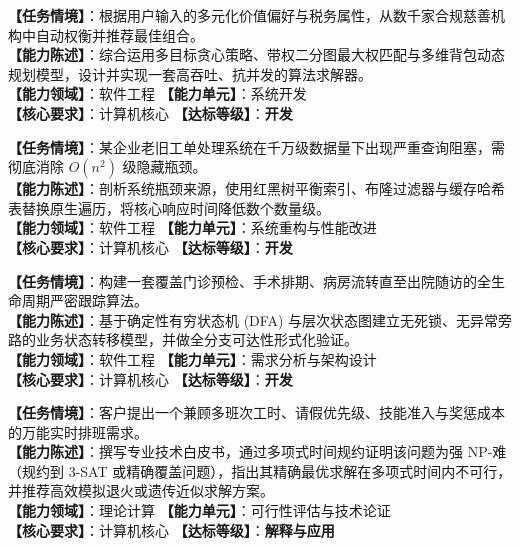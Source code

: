 \begin{taskbox}[任务 2：高精度慈善募捐个性化推荐与资产配置]
\textbf{【任务情境】}：根据用户输入的多元化价值偏好与税务属性，从数千家合规慈善机构中自动权衡并推荐最佳组合。\\
\textbf{【能力陈述】}：综合运用多目标贪心策略、带权二分图最大权匹配与多维背包动态规划模型，设计并实现一套高吞吐、抗并发的算法求解器。\\
\textbf{【能力领域】}：软件工程 \quad \textbf{【能力单元】}：系统开发\\
\textbf{【核心要求】}：计算机核心 \quad \textbf{【达标等级】}：\textbf{开发}
\end{taskbox}

\begin{taskbox}[任务 3：遗留客户服务系统的算法性能重构]
\textbf{【任务情境】}：某企业老旧工单处理系统在千万级数据量下出现严重查询阻塞，需彻底消除 $O(n^2)$ 级隐藏瓶颈。\\
\textbf{【能力陈述】}：剖析系统瓶颈来源，使用红黑树平衡索引、布隆过滤器与缓存哈希表替换原生遍历，将核心响应时间降低数个数量级。\\
\textbf{【能力领域】}：软件工程 \quad \textbf{【能力单元】}：系统重构与性能改进\\
\textbf{【核心要求】}：计算机核心 \quad \textbf{【达标等级】}：\textbf{开发}
\end{taskbox}

\begin{taskbox}[任务 4：跨机构医疗患者全流程状态跟踪自动化]
\textbf{【任务情境】}：构建一套覆盖门诊预检、手术排期、病房流转直至出院随访的全生命周期严密跟踪算法。\\
\textbf{【能力陈述】}：基于确定性有穷状态机 (DFA) 与层次状态图建立无死锁、无异常旁路的业务状态转移模型，并做全分支可达性形式化验证。\\
\textbf{【能力领域】}：软件工程 \quad \textbf{【能力单元】}：需求分析与架构设计\\
\textbf{【核心要求】}：计算机核心 \quad \textbf{【达标等级】}：\textbf{开发}
\end{taskbox}

\begin{taskbox}[任务 5：多维度复杂排班优化问题的难解性论证]
\textbf{【任务情境】}：客户提出一个兼顾多班次工时、请假优先级、技能准入与奖惩成本的万能实时排班需求。\\
\textbf{【能力陈述】}：撰写专业技术白皮书，通过多项式时间规约证明该问题为强 NP-难（规约到 3-SAT 或精确覆盖问题），指出其精确最优求解在多项式时间内不可行，并推荐高效模拟退火或遗传近似求解方案。\\
\textbf{【能力领域】}：理论计算 \quad \textbf{【能力单元】}：可行性评估与技术论证\\
\textbf{【核心要求】}：计算机核心 \quad \textbf{【达标等级】}：\textbf{解释与应用}
\end{taskbox}

